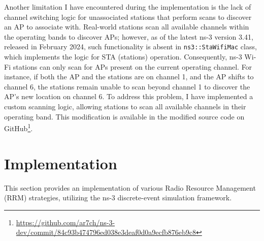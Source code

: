Another limitation I have encountered during the implementation is the lack of channel switching logic for unassociated stations that perform scans to discover an AP to associate with. Real-world stations scan all available channels within the operating bands to discover APs; however, as of the latest ns-3 version 3.41, released in February 2024, such functionality is absent in \texttt{ns3::StaWifiMac} class, which implements the logic for STA (stations) operation. Consequently, ns-3 Wi-Fi stations can only scan for APs present on the current operating channel. For instance, if both the AP and the stations are on channel 1, and the AP shifts to channel 6, the stations remain unable to scan beyond channel 1 to discover the AP's new location on channel 6. To address this problem, I have implemented a custom scanning logic, allowing stations to scan all available channels in their operating band. This modification is available in the modified source code on GitHub\footnote{\url{https://github.com/ar7ch/ns-3-dev/commit/84c93b474796ed038e3deaf0d0a9ecfb876eb9c8}}.


\section{Implementation}
\label{chap:impl:sec:implementation}
This section provides an implementation of various Radio Resource Management (RRM) strategies, utilizing the ns-3 discrete-event simulation framework.



